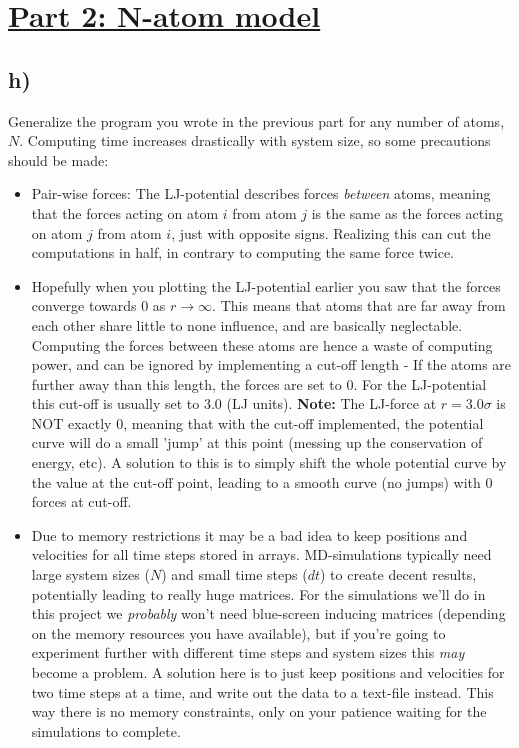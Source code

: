 \documentclass[11pt,british,a4paper]{report}
\begin{document}
\section*{\underline{Part 2: N-atom model}}

\subsection*{h)}

Generalize the program you wrote in the previous part for any number of atoms, $N$. Computing time increases drastically with system size, so some precautions should be made:

\begin{itemize}
  \item Pair-wise forces: The LJ-potential describes forces \textit{between} atoms, meaning that the forces acting on atom $i$ from atom $j$ is the same as the forces acting on atom $j$
  from atom $i$, just with opposite signs. Realizing this can cut the computations in half, in contrary to computing the same force twice.
  \item Hopefully when you plotting the LJ-potential earlier you saw that the forces converge towards 0 as $r \rightarrow \infty$. This means that atoms that are far away from each other
  share little to none influence, and are basically neglectable. Computing the forces between these atoms are hence a waste of computing power, and can be ignored by implementing a cut-off
  length - If the atoms are further away than this length, the forces are set to 0. For the LJ-potential this cut-off is usually set to 3.0 (LJ units).
  \textbf{Note:} The LJ-force at $r = 3.0\sigma$ is NOT exactly 0, meaning that with the cut-off implemented, the potential curve will do a small 'jump' at this point (messing up the
  conservation of energy, etc).
  A solution to this is to simply shift the whole potential curve by the value at the cut-off point, leading to a smooth curve (no jumps) with 0 forces at cut-off.
  \item Due to memory restrictions it may be a bad idea to keep positions and velocities for all time steps stored in arrays. MD-simulations typically need large system sizes ($N$)
  and small time steps ($dt$) to create decent results, potentially leading to really huge matrices. For the simulations we'll do in this project we \textit{probably} won't need blue-screen
  inducing matrices (depending on the memory resources you have available), but if you're going to experiment further with different time steps and system sizes this \textit{may} become
  a problem. A solution here is to just keep positions and velocities for two time steps at a time, and write out the data to a text-file instead. This way there is no memory constraints,
  only on your patience waiting for the simulations to complete.

\end{itemize}
\end{document}

